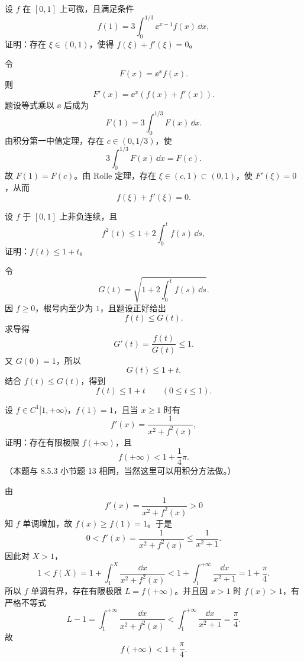 \begin{xreferenceproblem}[22]
设 $f$ 在 $[0,1]$ 上可微，且满足条件
\[
  f(1)=3\int_0^{1/3}\ee^{x-1}f(x)\,\dd x,
\]
证明：存在 $\xi\in(0,1)$，使得 $f(\xi)+f'(\xi)=0$。
\end{xreferenceproblem}
\begin{xsolution}
令
\[
  F(x)=\ee^x f(x).
\]
则
\[
  F'(x)=\ee^x(f(x)+f'(x)).
\]
题设等式乘以 $\ee$ 后成为
\[
  F(1)=3\int_0^{1/3}F(x)\,\dd x.
\]
由积分第一中值定理，存在 $c\in(0,1/3)$，使
\[
  3\int_0^{1/3}F(x)\,\dd x=F(c).
\]
故 $F(1)=F(c)$。由 Rolle 定理，存在 $\xi\in(c,1)\subset(0,1)$，使 $F'(\xi)=0$，从而
\[
  \boxed{f(\xi)+f'(\xi)=0}.
\]
\end{xsolution}


\begin{xreferenceproblem}[23]
设 $f$ 于 $[0,1]$ 上非负连续，且
\[
  f^2(t)\leqslant1+2\int_0^t f(s)\,\dd s,
\]
证明：$f(t)\leqslant1+t$。
\end{xreferenceproblem}
\begin{xsolution}
令
\[
  G(t)=\sqrt{1+2\int_0^t f(s)\,\dd s}.
\]
因 $f\geqslant0$，根号内至少为 $1$，且题设正好给出
\[
  f(t)\leqslant G(t).
\]
求导得
\[
  G'(t)=\frac{f(t)}{G(t)}\leqslant1.
\]
又 $G(0)=1$，所以
\[
  G(t)\leqslant1+t.
\]
结合 $f(t)\leqslant G(t)$，得到
\[
  \boxed{f(t)\leqslant1+t\qquad(0\leqslant t\leqslant1)}.
\]
\end{xsolution}


\begin{xreferenceproblem}[24]
设 $f\in C^1[1,+\infty)$，$f(1)=1$，且当 $x\geqslant1$ 时有
\[
  f'(x)=\frac1{x^2+f^2(x)},
\]
证明：存在有限极限 $f(+\infty)$，且
\[
  f(+\infty)<1+\frac14\pi.
\]
（本题与 8.5.3 小节题 13 相同，当然这里可以用积分方法做。）
\end{xreferenceproblem}
\begin{xsolution}
由
\[
  f'(x)=\frac1{x^2+f^2(x)}>0
\]
知 $f$ 单调增加，故 $f(x)\geqslant f(1)=1$。于是
\[
  0<f'(x)=\frac1{x^2+f^2(x)}
  \leqslant\frac1{x^2+1}.
\]
因此对 $X>1$，
\[
  1<f(X)
  =1+\int_1^X\frac{\dd x}{x^2+f^2(x)}
  <1+\int_1^{+\infty}\frac{\dd x}{x^2+1}
  =1+\frac\pi4.
\]
所以 $f$ 单调有界，存在有限极限 $L=f(+\infty)$。并且因 $x>1$ 时 $f(x)>1$，有严格不等式
\[
  L-1=\int_1^{+\infty}\frac{\dd x}{x^2+f^2(x)}
  <\int_1^{+\infty}\frac{\dd x}{x^2+1}
  =\frac\pi4.
\]
故
\[
  \boxed{f(+\infty)<1+\frac\pi4}.
\]
\end{xsolution}


